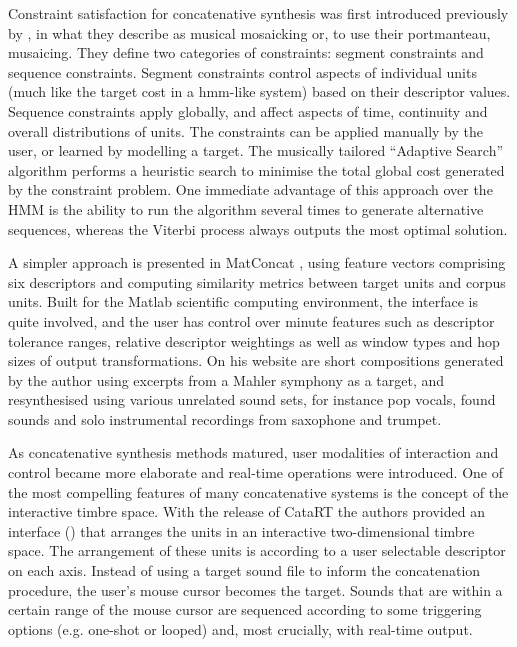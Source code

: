 Constraint satisfaction for concatenative synthesis was first introduced previously by \cite{Zils2001}, in what they describe as musical mosaicking or, to use their portmanteau, musaicing. They define two categories of constraints: segment constraints and sequence constraints. Segment constraints control aspects of individual units (much like the target cost in a \acrshort{hmm}-like system) based on their descriptor values. Sequence constraints apply globally, and affect aspects of time, continuity and overall distributions of units. The constraints can be applied manually by the user, or learned by modelling a target. The musically tailored “Adaptive Search” algorithm performs a heuristic search to minimise the total global cost generated by the constraint problem. One immediate advantage of this approach over the HMM is the ability to run the algorithm several times to generate alternative sequences, whereas the Viterbi process always outputs the most optimal solution.

 A simpler approach is presented in MatConcat \citep{Sturm2004}, using feature vectors comprising six descriptors and computing similarity metrics between target units and corpus units. Built for the Matlab scientific computing environment, the interface is quite involved, and the user has control over minute features such as descriptor tolerance ranges, relative descriptor weightings as well as window types and hop sizes of output transformations. On his website are short compositions generated by the author using excerpts from a Mahler symphony as a target, and resynthesised using various unrelated sound sets, for instance pop vocals, found sounds and solo instrumental recordings from saxophone and trumpet.

As concatenative synthesis methods matured, user modalities of interaction and control became more elaborate and real-time operations were introduced. One of the most compelling features of many concatenative systems is the concept of the interactive timbre space. With the release of CataRT \citep{Schwarz2006a} the authors provided an interface () that arranges the units in an interactive two-dimensional timbre space. The arrangement of these units is according to a user selectable descriptor on each axis. Instead of using a target sound file to inform the concatenation procedure, the user’s mouse cursor becomes the target. Sounds that are within a certain range of the mouse cursor are sequenced according to some triggering options (e.g. one-shot or  looped) and, most crucially, with real-time output.

